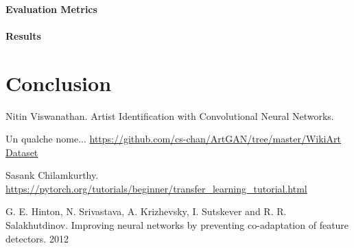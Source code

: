 \documentclass{article}
\begin{document}
\paragraph{Evaluation Metrics}

\paragraph{Results}




\section{Conclusion}

\begin{thebibliography}{1}
	
	Nitin Viswanathan.
	\newblock Artist Identification with Convolutional Neural Networks. 
	
	Un qualche nome... \newblock
	\url{https://github.com/cs-chan/ArtGAN/tree/master/WikiArt Dataset}
	
	Sasank Chilamkurthy.
	\url{https://pytorch.org/tutorials/beginner/transfer_learning_tutorial.html}
	
	G. E. Hinton, N. Srivastava, A. Krizhevsky, I. Sutskever and R. R. Salakhutdinov.
	Improving neural networks by preventing co-adaptation of feature detectors. 2012
	
\end{thebibliography}
\end{document}
